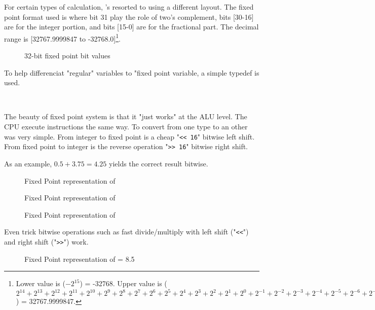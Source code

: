 For certain types of calculation, \doom's resorted to using a different layout. The fixed point format used is  where bit 31 play the role of two's complement, bits [30-16] are for the integer portion, and bits [15-0] are for the fractional part. The decimal range is [32767.9999847 to -32768.0]\footnote{
Lower value is ($-2^{15}$) = -32768. Upper value is  
 ($2^{14} + 2^{13} + 2^{12} + 2^{11} + 2^{10} + 2^9 + 2^8 + 2^7 + 2^6 + 2^5 + 2^4 + 2^3 + 2^2 + 2^1 + 2^0 + 2^{-1} + 2^{-2}+ 2^{-3}+ 2^{-4}+ 2^{-5}+ 2^{-6}+ 2^{-7}+ 2^{-8}+ 2^{-9}+ 2^{-10}+ 2^{-11}+ 2^{-12}+ 2^{-13}+ 2^{-14}+ 2^{-15}+ 2^{-16}$) = 32767.9999847.}.\\
\par
\begin{figure}[H]
 \centering
  
  \caption{32-bit \doom{} fixed point bit values}
\end{figure}
\par 
To help differenciat "regular" variables to "fixed point variable, a simple typedef  is used.\\
\par
{}\\
\par
The beauty of fixed point system is that it "just works" at the ALU level. The CPU execute instructions the same way. To convert from one type to an other was very simple. From integer to fixed point is a cheap "\verb!<< 16!" bitwise left shift. From fixed point to integer is the reverse operation "\verb|>> 16|" bitwise right shift.\\
\par


As an example, $0.5 + 3.75 = 4.25$ yields the correct result bitwise.\\
\par
\begin{figure}[H]
  \centering
  
  \caption{Fixed Point representation of }
\end{figure}
\begin{figure}[H]
  \centering
  
  \caption{Fixed Point representation of }
\end{figure}
\begin{figure}[H]
  \centering
  
  \caption{Fixed Point representation of }
\end{figure}
\par
Even trick bitwise operations such as fast divide/multiply with left shift ("\verb!<<!") and right shift ("\verb|>>|") work.\\
\par
\begin{figure}[H]
  \centering
  
  \caption{Fixed Point representation of  = 8.5}
\end{figure}
\par

